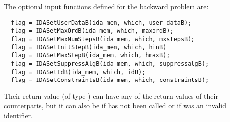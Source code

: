 The optional input functions defined for the backward problem are:
\begin{verbatim}
  flag = IDASetUserDataB(ida_mem, which, user_dataB);
  flag = IDASetMaxOrdB(ida_mem, which, maxordB);
  flag = IDASetMaxNumStepsB(ida_mem, which, mxstepsB);
  flag = IDASetInitStepB(ida_mem, which, hinB)
  flag = IDASetMaxStepB(ida_mem, which, hmaxB);
  flag = IDASetSuppressAlgB(ida_mem, which, suppressalgB);
  flag = IDASetIdB(ida_mem, which, idB);
  flag = IDASetConstraintsB(ida_mem, which, constraintsB);
\end{verbatim}
Their return value  (of type ) can have any of the return values 
of their counterparts, but it can also be  if  
has not been called or  if  was an invalid identifier. 


